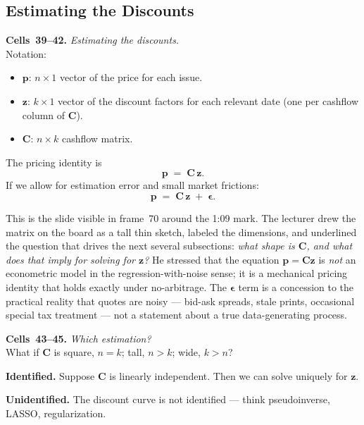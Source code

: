 \subsection{Estimating the Discounts}\label{L1-sec:estimate}

\begin{keyblock}
\textbf{Cells~39--42.} \emph{Estimating the discounts.}\\
Notation:
\begin{itemize}
  \item $\boldsymbol{p}$: $n\times 1$ vector of the price for each issue.
  \item $\boldsymbol{z}$: $k\times 1$ vector of the discount factors for each
        relevant date (one per cashflow column of $\mathbf{C}$).
  \item $\boldsymbol{C}$: $n\times k$ cashflow matrix.
\end{itemize}
The pricing identity is
\[
    \boldsymbol{p} \;=\; \boldsymbol{C}\,\boldsymbol{z}.
\]
If we allow for estimation error and small market frictions:
\[
    \boldsymbol{p} \;=\; \boldsymbol{C}\,\boldsymbol{z} \;+\; \boldsymbol{\epsilon}.
\]
\end{keyblock}

This is the slide visible in frame~70 around the 1:09 mark. The lecturer drew
the matrix on the board as a tall thin sketch, labeled the dimensions, and
underlined the question that drives the next several subsections: \emph{what
shape is $\mathbf{C}$, and what does that imply for solving for $\boldsymbol{z}$?}
He stressed that the equation $\boldsymbol{p}=\boldsymbol{C}\boldsymbol{z}$ is
\emph{not} an econometric model in the regression-with-noise sense; it is a
mechanical pricing identity that holds exactly under no-arbitrage. The
$\boldsymbol{\epsilon}$ term is a concession to the practical reality that
quotes are noisy --- bid-ask spreads, stale prints, occasional special tax
treatment --- not a statement about a true data-generating process.

\begin{keyblock}
\textbf{Cells~43--45.} \emph{Which estimation?}\\
What if $\mathbf{C}$ is square, $n=k$; tall, $n>k$; wide, $k>n$?

\textbf{Identified.} Suppose $\mathbf{C}$ is linearly independent. Then we can
solve uniquely for $\boldsymbol{z}$.

\textbf{Unidentified.} The discount curve is not identified --- think
pseudoinverse, LASSO, regularization.
\end{keyblock}


